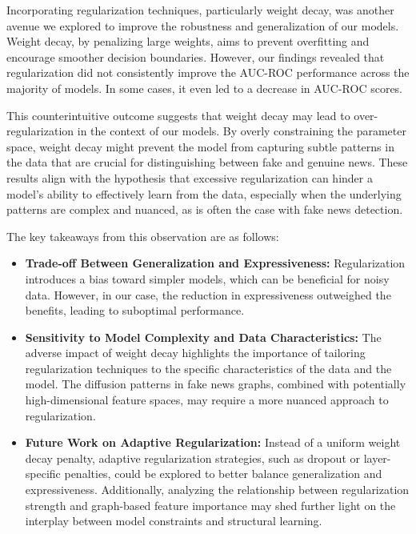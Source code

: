 \documentclass[sigconf,nonacm]{acmart}
\begin{document}
Incorporating regularization techniques, particularly weight decay, was another avenue we explored to improve the robustness and generalization of our models. Weight decay, by penalizing large weights, aims to prevent overfitting and encourage smoother decision boundaries. However, our findings revealed that regularization did not consistently improve the AUC-ROC performance across the majority of models. In some cases, it even led to a decrease in AUC-ROC scores.

This counterintuitive outcome suggests that weight decay may lead to over-regularization in the context of our models. By overly constraining the parameter space, weight decay might prevent the model from capturing subtle patterns in the data that are crucial for distinguishing between fake and genuine news. These results align with the hypothesis that excessive regularization can hinder a model's ability to effectively learn from the data, especially when the underlying patterns are complex and nuanced, as is often the case with fake news detection.

The key takeaways from this observation are as follows:
\begin{itemize}
    \item \textbf{Trade-off Between Generalization and Expressiveness:} Regularization introduces a bias toward simpler models, which can be beneficial for noisy data. However, in our case, the reduction in expressiveness outweighed the benefits, leading to suboptimal performance.
    \item \textbf{Sensitivity to Model Complexity and Data Characteristics:} The adverse impact of weight decay highlights the importance of tailoring regularization techniques to the specific characteristics of the data and the model. The diffusion patterns in fake news graphs, combined with potentially high-dimensional feature spaces, may require a more nuanced approach to regularization.
    \item \textbf{Future Work on Adaptive Regularization:} Instead of a uniform weight decay penalty, adaptive regularization strategies, such as dropout or layer-specific penalties, could be explored to better balance generalization and expressiveness. Additionally, analyzing the relationship between regularization strength and graph-based feature importance may shed further light on the interplay between model constraints and structural learning.
\end{itemize}

\vspace{1em} %
\end{document}
